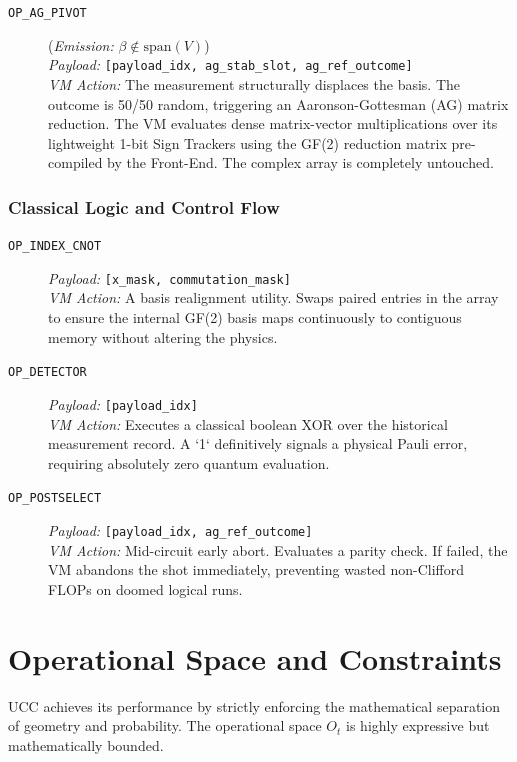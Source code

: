\documentclass[11pt]{article}
\begin{document}
\begin{description}
    \item[\texttt{OP\_AG\_PIVOT}] (\textit{Emission:} $\beta \notin \text{span}(V)$) \\
    \textit{Payload:} \texttt{[payload\_idx, ag\_stab\_slot, ag\_ref\_outcome]}\\
    \textit{VM Action:} The measurement structurally displaces the basis. The outcome is 50/50 random, triggering an Aaronson-Gottesman (AG) matrix reduction. The VM evaluates dense matrix-vector multiplications over its lightweight 1-bit Sign Trackers using the GF(2) reduction matrix pre-compiled by the Front-End. The complex array is completely untouched.
\end{description}

\subsubsection*{Classical Logic and Control Flow}
\begin{description}
    \item[\texttt{OP\_INDEX\_CNOT}]
    \textit{Payload:} \texttt{[x\_mask, commutation\_mask]}\\
    \textit{VM Action:} A basis realignment utility. Swaps paired entries in the array to ensure the internal GF(2) basis maps continuously to contiguous memory without altering the physics.

    \item[\texttt{OP\_DETECTOR}]
    \textit{Payload:} \texttt{[payload\_idx]}\\
    \textit{VM Action:} Executes a classical boolean XOR over the historical measurement record. A `1` definitively signals a physical Pauli error, requiring absolutely zero quantum evaluation.

    \item[\texttt{OP\_POSTSELECT}]
    \textit{Payload:} \texttt{[payload\_idx, ag\_ref\_outcome]}\\
    \textit{VM Action:} Mid-circuit early abort. Evaluates a parity check. If failed, the VM abandons the shot immediately, preventing wasted non-Clifford FLOPs on doomed logical runs.
\end{description}

\section{Operational Space and Constraints}
\label{sec:ops}

UCC achieves its performance by strictly enforcing the mathematical separation of geometry and probability. The operational space $O_t$ is highly expressive but mathematically bounded.
\end{document}
